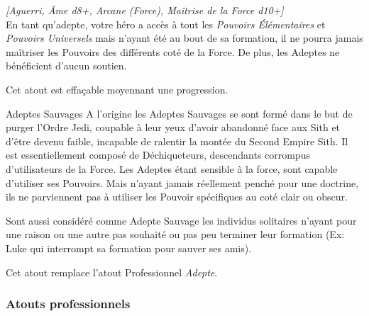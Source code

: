 \begin{description}[align=left]
    \item [Adepte Sauvage]
        \emph{[Aguerri, \^Ame d8+, Arcane (Force), Maîtrise de la Force d10+]}\\
        En tant qu’adepte, votre héro a accès à tout les \emph{Pouvoirs \'Elémentaires} et \emph{Pouvoirs Universels} mais n’ayant été au bout de sa formation, il ne pourra jamais maîtriser les Pouvoirs des différents coté de la Force. De plus, les Adeptes ne bénéficient d’aucun soutien.

        Cet atout est effaçable moyennant une progression.
        
\end{description}

\begin{paperbox}{Adeptes Sauvages}
A l’origine les Adeptes Sauvages se sont formé dans le but de purger l’Ordre Jedi, coupable à leur yeux d’avoir abandonné face aux Sith et d’être devenu faible, incapable de ralentir la montée du Second Empire Sith. Il est essentiellement composé de Déchiqueteurs, descendants corrompus d’utilisateurs de la Force. Les Adeptes étant sensible à la force, sont capable d’utiliser ses Pouvoirs. Mais n’ayant jamais réellement penché pour une doctrine, ils ne parviennent pas à utiliser les Pouvoir spécifiques au coté clair ou obscur.

Sont aussi considéré comme Adepte Sauvage les individus solitaires n’ayant pour une raison ou une autre pas souhaité ou pas peu terminer leur formation (Ex: Luke qui interrompt sa formation pour sauver ses amis). 

Cet atout remplace l’atout Professionnel \emph{Adepte}.
\end{paperbox}

\newpage
\subsubsection{Atouts professionnels}


